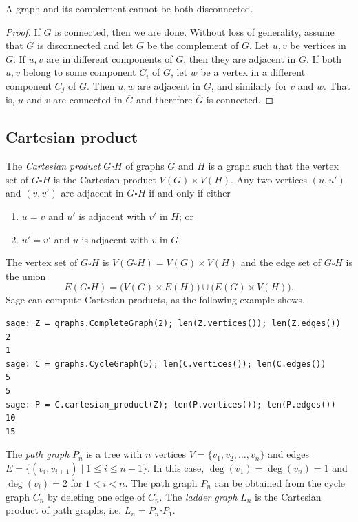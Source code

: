 \begin{theorem}
A graph and its complement cannot be both disconnected.
\end{theorem}

\begin{proof}
If $G$ is connected, then we are done. Without loss of generality,
assume that $G$ is disconnected and let $\overline{G}$ be the
complement of $G$. Let $u,v$ be vertices in $\overline{G}$. If $u,v$
are in different components of $G$, then they are adjacent in
$\overline{G}$. If both $u,v$ belong to some component $C_i$ of $G$,
let $w$ be a vertex in a different component $C_j$ of $G$. Then $u,w$
are adjacent in $\overline{G}$, and similarly for $v$ and $w$. That is,
$u$ and $v$ are connected in $\overline{G}$ and therefore $\overline{G}$
is connected.
\end{proof}



\subsection{Cartesian product}
\index{$\square$}

The \emph{Cartesian product} $G \square H$ of graphs $G$ and $H$ is a
graph such that the vertex set of $G \square H$ is the Cartesian
product $V(G) \times V(H)$. Any two vertices $(u, u')$ and $(v, v')$
are adjacent in $G \square H$ if and only if either
%
\begin{enumerate}
\item $u = v$ and $u'$ is adjacent with $v'$ in $H$; or

\item $u' = v'$ and $u$ is adjacent with $v$ in $G$.
\end{enumerate}
The vertex set of $G \square H$ is $V(G \square H) = V(G) \times V(H)$
and the edge set of $G \square H$ is the union
\[
E(G \square H)
=
\big(V(G) \times E(H)\big) \cup \big(E(G) \times V(H)\big).
\]
%
Sage can compute Cartesian products, as the following example shows.
%
\begin{lstlisting}
sage: Z = graphs.CompleteGraph(2); len(Z.vertices()); len(Z.edges())
2
1
sage: C = graphs.CycleGraph(5); len(C.vertices()); len(C.edges())
5
5
sage: P = C.cartesian_product(Z); len(P.vertices()); len(P.edges())
10
15
\end{lstlisting}

The \emph{path graph} $P_n$ is a tree with $n$ vertices
$V = \{v_1, v_2, \dots, v_n\}$ and edges
$E = \{ (v_i, v_{i+1}) \;|\; 1 \leq i \leq n-1 \}$. In this case,
$\deg(v_1) = \deg(v_n) = 1$ and $\deg(v_i) = 2$ for $1 < i < n$. The
path graph $P_n$ can be obtained from the cycle graph $C_n$ by
deleting one edge of $C_n$. The \emph{ladder graph} $L_n$ is the
Cartesian product of path graphs, i.e. $L_n = P_n \square P_1$.

